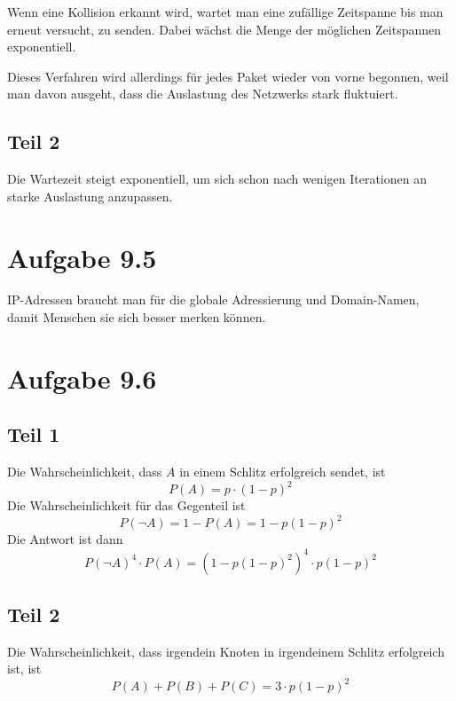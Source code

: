 \documentclass[10pt,a4paper]{article}
\begin{document}
Wenn eine Kollision erkannt wird, wartet man eine zufällige Zeitspanne bis man
erneut versucht, zu senden. Dabei wächst die Menge der möglichen Zeitspannen
exponentiell.

Dieses Verfahren wird allerdings für jedes Paket wieder von vorne begonnen, weil
man davon ausgeht, dass die Auslastung des Netzwerks stark fluktuiert.

\subsection{Teil 2}

Die Wartezeit steigt exponentiell, um sich schon nach wenigen Iterationen an
starke Auslastung anzupassen.

\section{Aufgabe 9.5}

IP-Adressen braucht man für die globale Adressierung und Domain-Namen, damit
Menschen sie sich besser merken können.

\section{Aufgabe 9.6}

\subsection{Teil 1}

Die Wahrscheinlichkeit, dass $A$ in einem Schlitz erfolgreich sendet, ist
\begin{equation}
  P(A) = p \cdot (1 - p)^{2}
\end{equation}
Die Wahrscheinlichkeit für das Gegenteil ist
\begin{equation}
  P(\lnot A) = 1 - P(A) = 1 - p(1 - p)^{2}
\end{equation}
Die Antwort ist dann
\begin{equation}
  P(\lnot A)^{4} \cdot P(A) = \left( 1 - p(1 - p)^{2} \right)^{4} \cdot p (1 - p)^{2}
\end{equation}

\subsection{Teil 2}

Die Wahrscheinlichkeit, dass irgendein Knoten in irgendeinem Schlitz erfolgreich
ist, ist
\begin{equation}
  P(A) + P(B) + P(C) = 3 \cdot p(1 - p)^{2}
\end{equation}
\end{document}
